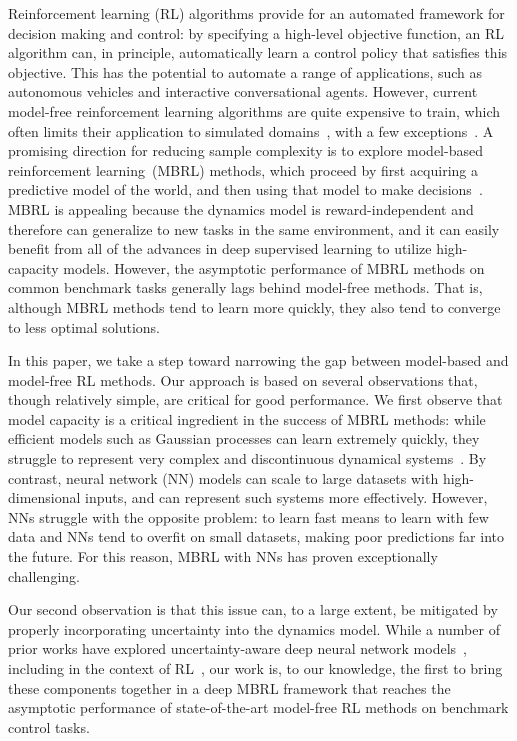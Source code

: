 Reinforcement learning (RL) algorithms provide for an automated framework for decision making and control: by specifying a high-level objective function, an RL algorithm can, in principle, automatically learn a control policy that satisfies this objective. 
This has the potential to automate a range of applications, such as autonomous vehicles and interactive conversational agents. 
However, current model-free reinforcement learning  algorithms are quite expensive to train, which often limits their application to simulated domains~\citep{Mnih2015,Lillicrap2016,schulman2017proximal}, with a few exceptions~\citep{Kober2009,Levine2016}. 
A promising direction for reducing sample complexity is to explore model-based reinforcement learning~(MBRL) methods, which proceed by first acquiring a predictive model of the world, and then using that model to make decisions~\citep{Atkeson1997,Kocijan2004,Deisenroth2014}. 
MBRL is appealing because the dynamics model is reward-independent and therefore can generalize to new tasks in the same environment, and it can easily benefit from all of the advances in deep supervised learning to utilize high-capacity models. 
However, the asymptotic performance of MBRL methods on common benchmark tasks generally lags behind model-free methods. That is, although MBRL methods tend to learn more quickly, they also tend to converge to less optimal solutions.

In this paper, we take a step toward narrowing the gap between model-based and model-free RL methods. 
Our approach is based on several observations that, though relatively simple, are critical for good performance. 
We first observe that model capacity is a critical ingredient in the success of MBRL methods: while efficient models such as Gaussian processes can learn extremely quickly, they struggle to represent very complex and discontinuous dynamical systems~\citep{Calandra2016a}. 
By contrast, neural network (NN) models can scale to large datasets with high-dimensional inputs, and can represent such systems more effectively. 
However, NNs struggle with the opposite problem: to learn fast means to learn with few data and NNs tend to overfit on small datasets, making poor predictions far into the future. 
For this reason, MBRL with NNs has proven exceptionally challenging.

Our second observation is that this issue can, to a large extent, be mitigated by properly incorporating uncertainty into the dynamics model. 
While a number of prior works have explored uncertainty-aware deep neural network models~\citep{neal1995bayesian,Lakshminarayanan2017}, including in the context of RL~\citep{Gal2016,Depeweg2016}, our work is, to our knowledge, the first to bring these components together in a deep MBRL framework that reaches the asymptotic performance of state-of-the-art model-free RL methods on benchmark control tasks. 

